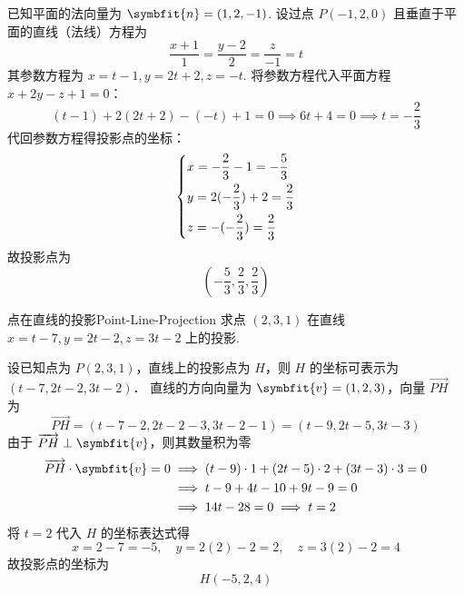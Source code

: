 \begin{solution}
    已知平面的法向量为 $\symbfit{n} = (1, 2, -1)$.
    设过点 $P(-1, 2, 0)$ 且垂直于平面的直线（法线）方程为
    \begin{equation}
        \frac{x + 1}{1} = \frac{y - 2}{2} = \frac{z}{-1} = t
    \end{equation}
    其参数方程为 $x = t - 1, y = 2t + 2, z = -t$.
    将参数方程代入平面方程 $x + 2y - z + 1 = 0$：
    \begin{equation}
        (t - 1) + 2(2t + 2) - (-t) + 1 = 0 \implies 6t + 4 = 0 \implies t = -\frac{2}{3}
    \end{equation}
    代回参数方程得投影点的坐标：
    \begin{equation}
        \begin{dcases} x = -\frac{2}{3} - 1 = -\frac{5}{3} \\ y = 2(-\frac{2}{3}) + 2 = \frac{2}{3} \\ z = -(-\frac{2}{3}) = \frac{2}{3} \end{dcases}
    \end{equation}
    故投影点为
    \begin{equation}
        \boxed{\left( -\frac{5}{3}, \frac{2}{3}, \frac{2}{3} \right)}
    \end{equation}
\end{solution}


\begin{problem}{点在直线的投影}{Point-Line-Projection}
    求点 $(2, 3, 1)$ 在直线 $x = t - 7, y = 2t - 2, z = 3t - 2$ 上的投影.
\end{problem}

\begin{solution}
    设已知点为 $P(2, 3, 1)$，直线上的投影点为 $H$，则 $H$ 的坐标可表示为 $(t - 7, 2t - 2, 3t - 2)$．
    直线的方向向量为 $\symbfit{v} = (1, 2, 3)$，向量 $\overrightarrow{PH}$ 为
    \begin{equation}
        \overrightarrow{PH} = (t - 7 - 2, 2t - 2 - 3, 3t - 2 - 1) = (t - 9, 2t - 5, 3t - 3)
    \end{equation}
    由于 $\overrightarrow{PH} \perp \symbfit{v}$，则其数量积为零
    \begin{equation}
        \begin{aligned}
            \overrightarrow{PH} \cdot \symbfit{v} = 0
             & \implies (t - 9) \cdot 1 + (2t - 5) \cdot 2 + (3t - 3) \cdot 3 = 0 \\
             & \implies t - 9 + 4t - 10 + 9t - 9 = 0                              \\
             & \implies 14t - 28 = 0 \implies t = 2
        \end{aligned}
    \end{equation}
    将 $t = 2$ 代入 $H$ 的坐标表达式得
    \begin{equation}
        x = 2 - 7 = -5, \quad y = 2(2) - 2 = 2, \quad z = 3(2) - 2 = 4
    \end{equation}
    故投影点的坐标为
    \begin{equation}
        \boxed{H(-5, 2, 4)}
    \end{equation}
\end{solution}


